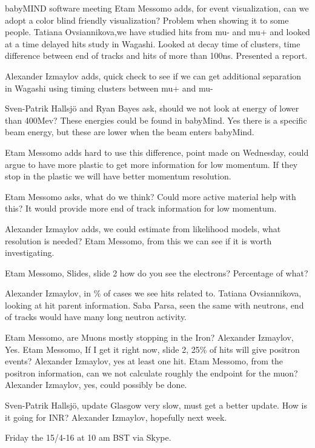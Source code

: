 \documentclass{article}
\begin{document}
\begin{Minutes}{babyMIND software meeting}
Etam Messomo adds, for event visualization, can we adopt a color blind friendly visualization? Problem when showing it to some people.
Tatiana Ovsiannikova,we have studied hits from mu- and mu+ and looked at a time delayed hits study in Wagashi.
Looked at decay time of clusters, time difference between end of tracks and hits of more than 100ns.
Presented a report.

Alexander Izmaylov adds, quick check to see if we can get additional separation in Wagashi using timing clusters between mu+ and mu-

Sven-Patrik Hallsj\"o and Ryan Bayes ask, should we not look at energy of lower than 400Mev? These energies could be found in babyMind. Yes there is a specific beam energy, but these are lower when the beam enters babyMind.

Etam Messomo adds hard to use this difference, point made on Wednesday, could argue to have more plastic to get more information for low momentum. If they stop in the plastic we will have better momentum resolution.

Etam Messomo asks, what do we think? Could more active material help with this? It would provide more end of track information for low momentum.

Alexander Izmaylov adds, we could estimate from likelihood models, what resolution is needed? 
Etam Messomo, from this we can see if it is worth investigating.

Etam Messomo, Slides, slide 2 how do you see the electrons? Percentage of what?

Alexander Izmaylov, in \% of cases we see hits related to.
Tatiana Ovsiannikova, looking at hit parent information.
Saba Parsa, seen the same with neutrons, end of tracks would have many long neutron activity.

Etam Messomo, are Muons mostly stopping in the Iron?
Alexander Izmaylov, Yes.
Etam Messomo, If I get it right now, slide 2, 25\% of hits will give positron events?
Alexander Izmaylov, yes at least one hit.
Etam Messomo, from the positron information, can we not calculate roughly the endpoint for the muon?
Alexander Izmaylov, yes, could possibly be done.


Sven-Patrik Hallsj\"o, update Glasgow very slow, must get a better update. How is it going for INR?
Alexander Izmaylov, hopefully next week.


Friday the 15/4-16 at 10 am BST via Skype.

\end{Minutes}
\end{document}
